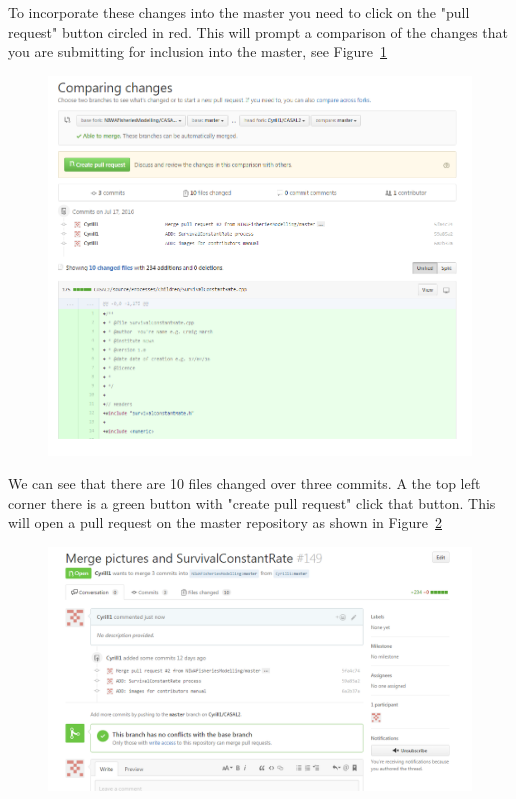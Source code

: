 To incorporate these changes into the master you need to click on the "pull request" button circled in red. This will prompt a comparison of the changes that you are submitting for inclusion into the master, see Figure~\ref{fig:fork_merge1}
\clearpage
\begin{figure}[!ht]
	\includegraphics[scale=0.6]{Figures/Pull_request.png}
	\caption{}\label{fig:fork_merge1}
\end{figure}

We can see that there are 10 files changed over three commits. A the top left corner there is a green button with "create pull request" click that button. This will open a pull request on the master repository as shown in Figure~\ref{fig:fork_merge2}
\begin{figure}[!ht]
	\includegraphics[scale=0.6]{Figures/Pull_request1.png}
	\caption{}\label{fig:fork_merge2}
\end{figure}

